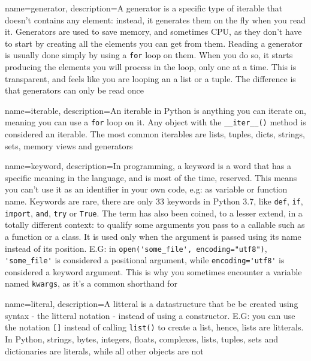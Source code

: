 {
    name=generator,
    description={A generator is a specific type of \gls{iterable} that doesn't contains any element: instead, it generates them on the fly when you read it. Generators are used to save memory, and sometimes CPU, as they don't have to start by creating all the elements you can get from them. Reading a generator is usually done simply by using a \lstinline{for} loop on them. When you do so, it starts producing the elements you will process in the loop, only one at a time. This is transparent, and feels like you are looping an a list or a tuple. The difference is that generators can only be read once}
}


{
    name=iterable,
    description={An iterable in Python is anything you can iterate on, meaning you can use a \lstinline{for} loop on it. Any object with the \lstinline{__iter__()} method is considered an iterable. The most common iterables are lists, tuples, dicts, strings, sets, memory views and generators}
}


{
    name=keyword,
    description={In programming, a keyword is a word that has a specific meaning in the language, and is most of the time, reserved. This means you can't use it as an identifier in your own code, e.g: as variable or function name. Keywords are rare, there are only 33 keywords in Python 3.7, like \lstinline{def}, \lstinline{if}, \lstinline{import}, \lstinline{and}, \lstinline{try} or \lstinline{True}. The term  has also been coined, to a lesser extend, in a totally different context: to qualify some arguments you pass to a \gls{callable} such as a function or a class. It is used only when the argument is passed using its name instead of its position. E.G: in \lstinline{open('some_file', encoding="utf8")}, \lstinline{'some_file'} is considered a positional argument, while \lstinline{encoding='utf8'} is considered a keyword argument. This is why you sometimes encounter a variable named \lstinline{kwargs}, as it's a common shorthand for }
}

{
    name=literal,
    description={A litteral is a datastructure that be be created using syntax - the litteral notation - instead of using a constructor. E.G: you can use the notation \lstinline{[]} instead of calling  \lstinline{list()} to create a list, hence, lists are litterals. In Python, strings, bytes, integers, floats, complexes, lists, tuples, sets and dictionaries are literals, while all other objects are not}
}


